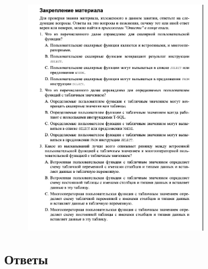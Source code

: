 \begin{figure}[h!]
	\begin{center}
		\includegraphics[width=0.7\textwidth]{img/zakrep32.png}
	\end{center}
	\captionsetup{justification=centering}
\end{figure}
\clearpage

\subsection*{Ответы}

